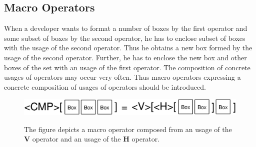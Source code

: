 \documentclass[12pt,notitlepage,a4paper]{report}
\begin{document}
\subsection{Macro Operators}
When a developer wants to format a number of boxes by the first operator and some subset of boxes by the second operator, he has to enclose subset of boxes with the usage of the second operator. Thus he obtains a new box formed by the usage of the second operator. Further, he has to enclose the new box and other boxes of the set with an usage of the first operator. The composition of concrete usages of operators may occur very often. Thus  macro operators expressing a concrete composition of usages of operators should be introduced.

\begin{figure}[h!]
\caption{The figure depicts a macro operator composed from an usage of the \textbf{V} operator and an usage of the \textbf{H} operator.}
\includegraphics[scale=0.4]{pictures/MacroOperator.eps}
\label{MacroOperator}
\end{figure}
\noindent

\vspace{20mm}



\newcommand{\bibitemiso}[3]{\bibitem{#1} #2: \textit{#3}}
\end{document}
